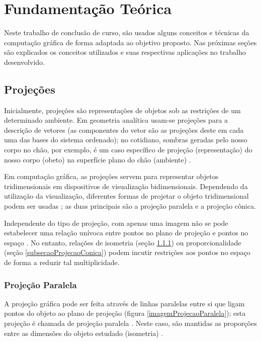 \chapter{Fundamentação Teórica}
	\label{capituloReferencialTeorico}
	Neste trabalho de conclusão de curso, são usados alguns conceitos e técnicas da computação gráfica de forma adaptada ao objetivo proposto. Nas próximas seções são explicados os conceitos utilizados e suas respectivas aplicações no trabalho desenvolvido.
	
	\section{Projeções}
		\label{secaoProjecoes}
		
		Inicialmente, projeções são representações de objetos sob as restrições de um determinado ambiente. Em geometria analítica usam-se projeções para a descrição de vetores (as componentes do vetor são as projeções deste em cada uma das bases do sistema ordenado); no cotidiano, sombras geradas pelo nosso corpo no chão, por exemplo, é um caso específico de projeção (representação) do nosso corpo (obeto) na superfície plano do chão (ambiente) \cite{archiGeoBook}.
		
		Em computação gráfica, as projeções servem para representar objetos tridimensionais em dispositivos de visualização bidimensionais. Dependendo da utilização da visualização, diferentes formas de projetar o objeto tridimensional podem ser usadas \cite{archiGeoBook}; as duas principais são a projeção paralela e a projeção cônica.
		
		Independente do tipo de projeção, com apenas uma imagem não se pode estabelecer uma relação unívoca entre pontos no plano de projeção e pontos no espaço \cite{foto3D}. No entanto, relações de isometria (seção \ref{subsecaoProjecaoParalela}) ou proporcionalidade (seção \ref{subsecaoProjecaoConica}) podem incutir restrições aos pontos no espaço de forma a reduzir tal multiplicidade.
		
		\subsection{Projeção Paralela}
			\label{subsecaoProjecaoParalela}
			A projeção gráfica pode ser feita através de linhas paralelas entre si que ligam pontos do objeto ao plano de projeção (figura \ref{imagemProjecaoParalela}); esta projeção é chamada de projeção paralela \cite{archiGeoBook}. Neste caso, são mantidas as proporções entre as dimensões do objeto estudado (isometria) \cite{fundCompGraf}.
		
